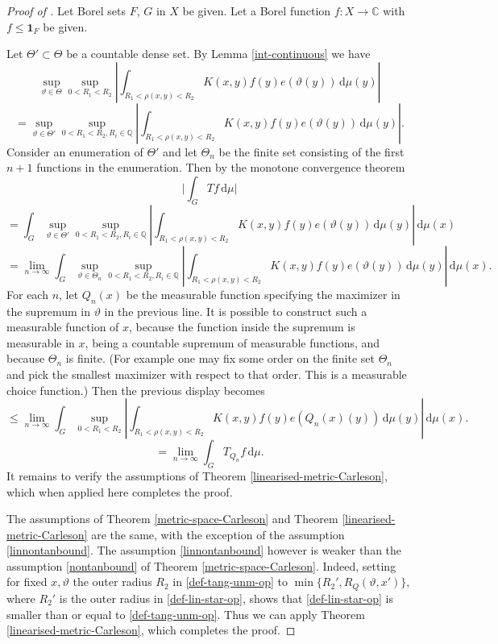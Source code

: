 \documentclass[10pt,a4paper]{article}
\theoremstyle{plain}
\theoremstyle{definition}
\numberwithin{equation}{subsection}
\newcommand{\mfa}{{\vartheta}}
\newcommand{\Mf}{{\Theta}}
\newcommand{\proves}[1]{}
\newcommand{\leanok}{}
\begin{document}
\begin{proof}[Proof of ]
    \leanok
    \proves{metric-space-Carleson}
    Let Borel sets $F$, $G$ in $X$ be given. Let a Borel function $f: X \to \mathbb{C}$ with $f \le \mathbf{1}_F$ be given.

    Let $\Mf' \subset \Mf$ be a countable dense set. By Lemma \ref{int-continuous} we have
    \[
        \sup_{\mfa\in\Mf} \sup_{0 < R_1 < R_2}\left| \int_{R_1 < \rho(x,y) < R_2} K(x,y) f(y) e(\mfa(y)) \, \mathrm{d}\mu(y) \right|
    \]
    \[
        = \sup_{\mfa\in\Mf'} \sup_{0 < R_1 < R_2, R_i \in \mathbb{Q}}\left| \int_{R_1 < \rho(x,y) < R_2} K(x,y) f(y) e(\mfa(y)) \, \mathrm{d}\mu(y) \right|.
    \]
    Consider an enumeration of $\Mf'$ and let $\Mf_n$ be the finite set consisting of the first $n+1$ functions in the enumeration. Then by the monotone convergence theorem
    \[
        \Big| \int_G Tf \, \mathrm{d}\mu\Big|
    \]
    \[
        = \int_G \sup_{\mfa\in\Mf'} \sup_{0 < R_1 < R_2, R_i \in \mathbb{Q}}\left| \int_{R_1 < \rho(x,y) < R_2} K(x,y) f(y) e(\mfa(y)) \, \mathrm{d}\mu(y) \right| \, \mathrm{d}\mu(x)
    \]
    \[
        = \lim_{n \to \infty} \int_G \sup_{\mfa\in\Mf_n} \sup_{0 < R_1 < R_2, R_i \in \mathbb{Q}}\left| \int_{R_1 < \rho(x,y) < R_2} K(x,y) f(y) e(\mfa(y)) \, \mathrm{d}\mu(y) \right| \, \mathrm{d}\mu(x).
    \]
    For each $n$, let $Q_n(x)$ be the measurable function specifying the maximizer in the supremum in $\mfa$ in the previous line. It is possible to construct such a measurable function of $x$, because the function inside the supremum is measurable in $x$, being a countable supremum of measurable functions, and because $\Mf_n$ is finite. (For example one may fix some order on the finite set $\Mf_n$ and pick the smallest maximizer with respect to that order. This is a measurable choice function.) Then the previous display becomes
    \[
        \le \lim_{n \to \infty} \int_G \sup_{0 < R_1 < R_2} \left| \int_{R_1 < \rho(x,y) < R_2} K(x,y) f(y) e(Q_n(x)(y)) \, \mathrm{d}\mu(y) \right| \, \mathrm{d}\mu(x).
    \]
    \[
        = \lim_{n \to \infty} \int_G T_{Q_n} f \, \mathrm{d}\mu.
    \]
    It remains to verify the assumptions of Theorem \ref{linearised-metric-Carleson}, which when applied here completes the proof.

    The assumptions of Theorem \ref{metric-space-Carleson} and Theorem \ref{linearised-metric-Carleson} are the same,
    with the exception of the assumption \eqref{linnontanbound}.
    The assumption \eqref{linnontanbound} however is weaker than the assumption \eqref{nontanbound}
    of Theorem \ref{metric-space-Carleson}.
    Indeed, setting for fixed $x, \mfa$ the outer radius $R_2$ in \eqref{def-tang-unm-op} to
    $\min\{R_2', R_Q(\mfa, x')\}$, where $R_2'$ is the outer radius in \eqref{def-lin-star-op},
    shows that \eqref{def-lin-star-op} is smaller than or equal to \eqref{def-tang-unm-op}.
    Thus we can apply Theorem \ref{linearised-metric-Carleson}, which completes the proof.
\end{proof}
\end{document}

